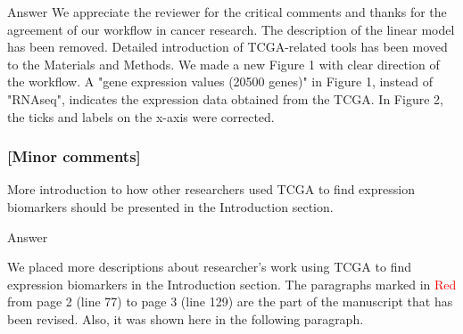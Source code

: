 \documentclass[preprint,12pt]{elsarticle}
\newenvironment{MyColorPar}[1]{%
    \leavevmode\color{#1}\ignorespaces%
}{%
}%
\begin{document}
%
\begin{MyColorPar}{blue}
Answer
We appreciate the reviewer for the critical comments and thanks for the agreement of our workflow in cancer research.
The description of the linear model has been removed. 
Detailed introduction of TCGA-related tools has been moved to the Materials and Methods.
We made a new Figure 1 with clear direction of the workflow.
A "gene expression values (20500 genes)" in Figure 1, instead of "RNAseq", indicates the expression data obtained from the TCGA.
In Figure 2, the ticks and labels on the x-axis were corrected.\\[0.5cm]


\begin{MyColorPar}{black} %
\subsubsection*{[Minor comments]}

More introduction to how other researchers used TCGA to find expression biomarkers should be presented in the Introduction section.
\end{MyColorPar}

Answer

We placed more descriptions about researcher's work using TCGA to find expression biomarkers in the Introduction section.
The paragraphs marked in \textcolor{red}{Red} from page 2 (line 77) to page 3 (line 129) are the part of the manuscript that has been revised. Also, it was shown here in the following paragraph.\\[0.3cm]

\begin{MyColorPar}{red}


\end{MyColorPar}
\end{MyColorPar}
\end{document}
